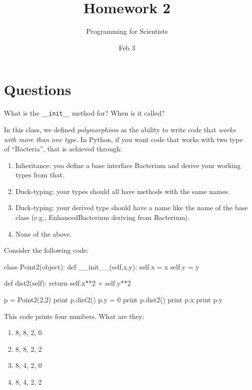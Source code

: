 
\author{Programming for Scientists}
\title{Homework 2}
\date{Feb 3}

\maketitle

\chapter{Questions}

\question
What is the \lstinline{__init__} method for? When is it called?

\question
In this class, we defined \textit{polymorphism} as the ability to write code that \emph{works with more than one type}. In Python, if you want code that works with two type of ``Bacteria'', that is achieved through:

\begin{enumerate}[a]
\item Inheritance: you define a base interface Bacterium and derive your working types from that.
\item Duck-typing: your types should all have methods with the same names.
\item Duck-typing: your derived type should have a name like the name of the base class (e.g., EnhancedBacterium deriving from Bacterium).
\item None of the above.
\end{enumerate}

\question
Consider the following code:

\begin{python}
class Point2(object):
    def __init__(self,x,y):
        self.x = x
        self.y = y

    def dist2(self):
        return self.x**2 + self.y**2 

p = Point2(2,2)
print p.dist2()
p.y = 0
print p.dist2()
print p.x
print p.y
\end{python}

This code prints four numbers. What are they:

\begin{enumerate}[a]
\item 8, 8, 2, 0
\item 8, 8, 2, 2
\item 8, 4, 2, 0
\item 8, 4, 2, 2
\end{enumerate}

